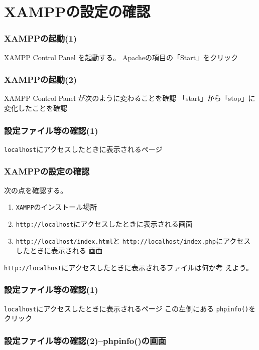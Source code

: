 
\renewcommand{\theFancyVerbLine}{\footnotesize\arabic{FancyVerbLine}}

\frame{\maketitle}
\section{XAMPPの設定の確認}
\begin{frame}[containsverbatim]
 \frametitle{XAMPPの起動(1)}
 XAMPP Control Panel を起動する。
 Apacheの項目の「Start」をクリック
\end{frame}
\begin{frame}[containsverbatim]
 \frametitle{XAMPPの起動(2)}
 XAMPP Control Panel が次のように変わることを確認
 「start」から「stop」に変化したことを確認
\end{frame}
\begin{frame}[containsverbatim]
 \frametitle{設定ファイル等の確認(1)}
 \texttt{localhost}にアクセスしたときに表示されるページ
 \end{frame}
\begin{frame}[containsverbatim]
 \frametitle{XAMPPの設定の確認}
 次の点を確認する。
\begin{enumerate}
  \item \texttt{XAMPP}のインストール場所
  \item \texttt{http://localhost}にアクセスしたときに表示される画面
  \item \texttt{http://localhost/index.html}と
       \texttt{http://localhost/index.php}にアクセスしたときに表示される
        画面
\end{enumerate}
 \texttt{http://localhost}にアクセスしたときに表示されるファイルは何か考
 えよう。
\end{frame}
\begin{frame}[containsverbatim]
 \frametitle{設定ファイル等の確認(1)}
 \texttt{localhost}にアクセスしたときに表示されるページ
 この左側にある \texttt{phpinfo()}をクリック
 \end{frame}
\begin{frame}[containsverbatim]
 \frametitle{設定ファイル等の確認(2)--phpinfo()の画面}
\end{frame}
